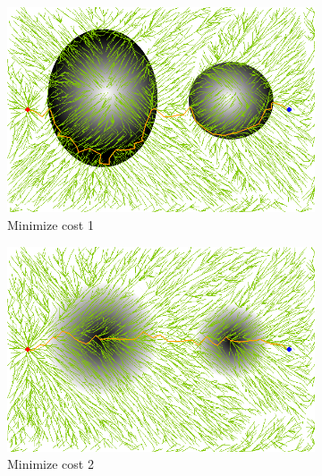 \documentclass{article}
\begin{document}
\begin{figure}
	\centering
	\begin{subfigure}[b]{0.45\linewidth}
		\centering
		\includegraphics[width=\textwidth]{fig/sim8-nconvex/MORRTstar03-0.png}
		\caption{Minimize cost 1}
		\label{fig:sim:nonconvex:fitness1}
	\end{subfigure}
	\begin{subfigure}[b]{0.45\linewidth}
		\centering
		\includegraphics[width=\textwidth]{fig/sim8-nconvex/MORRTstar03-1.png}
		\caption{Minimize cost 2}
		\label{fig:sim:nonconvex:fitness2}
	\end{subfigure}  \\
	\begin{subfigure}[b]{0.45\linewidth}
		\centering

\end{subfigure}
\end{figure}
\end{document}
